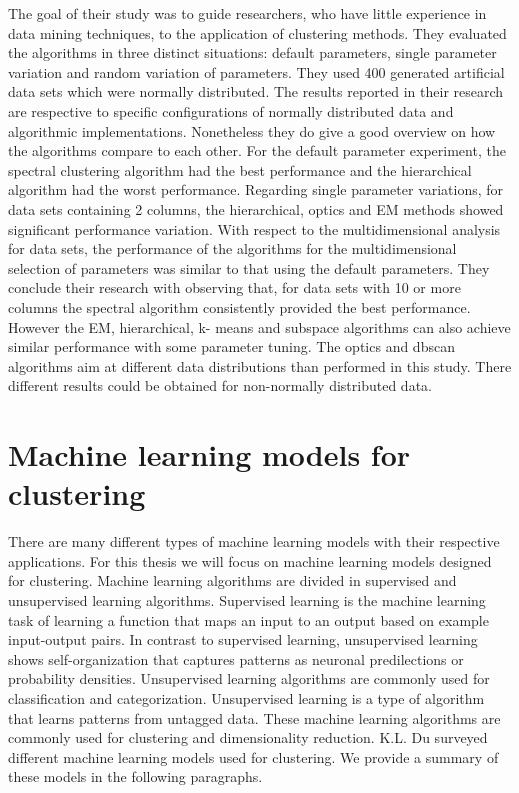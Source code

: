 \documentclass[../main]{subfiles}
\begin{document}
The goal of their study was to guide researchers, who have little experience in data mining techniques, to the application of clustering methods.
They evaluated the algorithms in three distinct situations: default parameters, single parameter variation and random variation of parameters.
They used 400 generated artificial data sets which were normally distributed.
\newline
The results reported in their research are respective to specific configurations of normally distributed data and algorithmic implementations.
Nonetheless they do give a good overview on how the algorithms compare to each other.
\newline
For the default parameter experiment, the spectral clustering algorithm had the best performance and the hierarchical algorithm had the worst performance.
\newline
Regarding single parameter variations, for data sets containing 2 columns, the hierarchical, optics and EM methods showed significant performance variation.
\newline
With respect to the multidimensional analysis for data sets, the performance of the algorithms for the multidimensional selection of parameters was similar to that using the default parameters.
They conclude their research with observing that, for data sets with 10 or more columns the spectral algorithm consistently provided the best performance.
However the EM, hierarchical, k- means and subspace algorithms can also achieve similar performance with some parameter tuning.
The optics and dbscan algorithms aim at different data distributions than performed in this study. There different results could be obtained for non-normally distributed data.

\section{Machine learning models for clustering}
\label{ch:neuralNetworkSurvey}
There are many different types of machine learning models with their respective applications.
For this thesis we will focus on machine learning models designed for clustering.
\newline
Machine learning algorithms are divided in supervised and unsupervised learning algorithms\cite{supervisedUnsupervised}.
Supervised learning is the machine learning task of learning a function that maps an input to an output based on example input-output pairs\cite{supervisedUnsupervised}.
In contrast to supervised learning, unsupervised learning shows self-organization that captures patterns as neuronal predilections or probability densities\cite{supervisedUnsupervised}.
Unsupervised learning algorithms are commonly used for classification and categorization\cite{supervisedUnsupervised}.
Unsupervised learning is a type of algorithm that learns patterns from untagged data\cite{supervisedUnsupervised}.
These machine learning algorithms are commonly used for clustering and dimensionality reduction\cite{supervisedUnsupervised}.
\newline
K.L. Du surveyed different machine learning models used for clustering\cite{Du2010Clustering:Approach}.
We provide a summary of these models in the following paragraphs.
\end{document}
